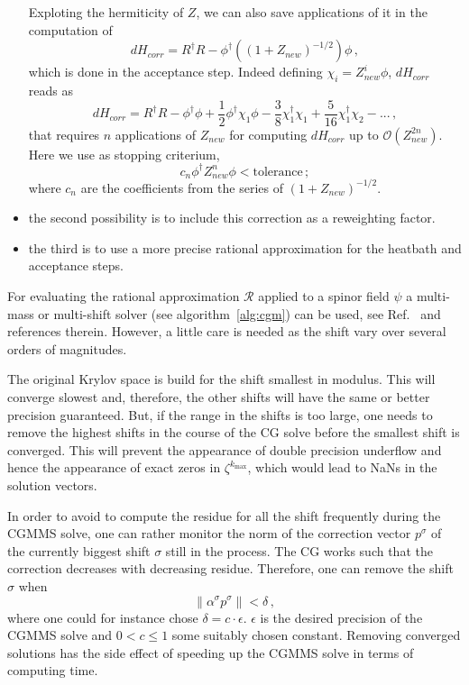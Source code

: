 \begin{itemize}
  Exploting the hermiticity of $Z$, we can also save applications of it in the computation of
  \[
  dH_{corr} = R^\dagger R - \phi^\dagger\left((1+Z_{new})^{-1/2}\right)\phi\,,
  \]
  which is done in the acceptance step. Indeed defining $\chi_i = Z_{new}^i\phi$, $dH_{corr}$ reads as
  \[
  dH_{corr} = R^\dagger R - \phi^\dagger\phi + \frac{1}{2}\phi^\dagger\chi_1\phi - \frac{3}{8}\chi_1^\dagger\chi_1 + \frac{5}{16} \chi_1^\dagger\chi_2 - ...\,,
  \]
  that requires $n$ applications of $Z_{new}$ for computing $dH_{corr}$ up to $\mathcal{O}(Z_{new}^{2n})$.
  Here we use as stopping criterium,
  \[
  c_n \phi^\dagger Z_{new}^{n} \phi < \text{tolerance}\,;
  \]
  where $c_n$ are the coefficients from the series of $(1+Z_{new})^{-1/2}$.

\item the second possibility is to include this correction as a
  reweighting factor.
\item the third is to use a more precise rational approximation for
  the heatbath and acceptance steps.
\end{itemize}

For evaluating the rational approximation $\mathcal{R}$ applied to a
spinor field $\psi$ a multi-mass or multi-shift solver (see
algorithm~\ref{alg:cgm}) can be used, see Ref.~\cite{Chiarappa:2006hz}
and references therein. However, a little care is needed
as the shift vary over several orders of magnitudes.

The original Krylov space is build for the shift smallest in
modulus. This will converge slowest and, therefore, the other shifts
will have the same or better precision guaranteed. But, if the
range in the shifts is too large, one needs to remove the highest
shifts in the course of the CG solve before the smallest shift is
converged. This will prevent the appearance of double precision
underflow and hence the appearance of exact zeros in
$\zeta^{k_\mathrm{max}}$, which would lead to 
NaNs in the solution vectors.

In order to avoid to compute the residue for all the shift frequently
during the CGMMS solve, one can rather monitor the norm of the
correction vector $p^\sigma$ of the currently biggest shift $\sigma$
still in the process. The CG works such that the correction decreases
with decreasing residue. Therefore, one can remove the shift $\sigma$
when
\[
\|\alpha^\sigma p^\sigma\| < \delta\,,
\]
where one could for instance chose $\delta =
c\cdot\epsilon$. $\epsilon$ is the desired precision of the CGMMS
solve and $0<c\leq1$ some suitably chosen constant. Removing converged
solutions has the side effect of speeding up the CGMMS solve in terms
of computing time.

